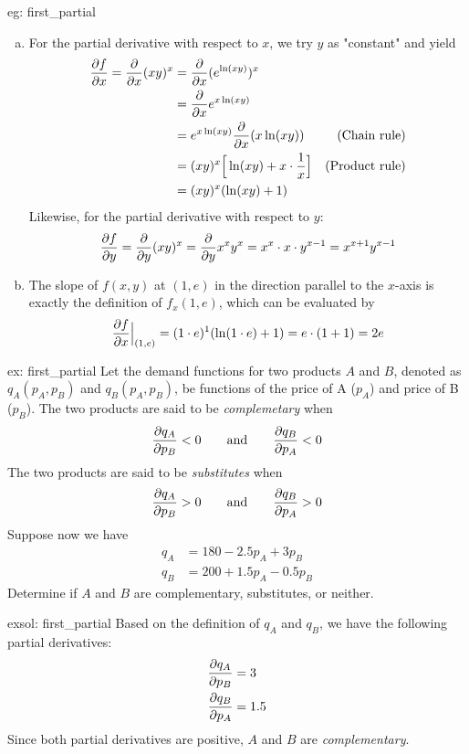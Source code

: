 \begin{egsol}[]{eg: first_partial}
    \begin{enumerate}[a)]
        \item For the partial derivative with respect to $x$, we try $y$ as "constant" and yield
        \begin{align*}
            \frac{\partial f}{\partial x} = \frac{\partial}{\partial x} (xy)^x&= \frac{\partial}{\partial x} (e^{\ln(xy)})^x &\\
            &= \frac{\partial}{\partial x} e^{x \ln(xy)}&\\
            &= e^{x \ln(xy)} \frac{\partial}{\partial x} (x \ln (xy))&\text{(Chain rule)}\\
            &= (xy)^x \Big[\ln(xy) + x \cdot \frac{1}{x}\Big]&\text{(Product rule)}\\
            &= (xy)^x(\ln(xy)+1)& 
        \end{align*}
        Likewise, for the partial derivative with respect to $y$:
        \[\frac{\partial f}{\partial y} = \frac{\partial}{\partial y}(xy)^x = \frac{\partial}{\partial y} x^x y^x = x^x \cdot x \cdot y^{x-1} = x^{x+1}y^{x-1}\]
        \item The slope of $f(x,y)$ at $(1,e)$ in the direction parallel to the $x$-axis is exactly the definition of $f_x(1,e)$, which can be evaluated by
        \[\frac{\partial f}{\partial x}\Big|_{(1,e)} = (1 \cdot e)^1 (\ln(1 \cdot e) + 1) = e \cdot (1+1) = 2e\]
    \end{enumerate}
\end{egsol}

\begin{ex}[]{ex: first_partial}
    Let the demand functions for two products $A$ and $B$, denoted as $q_A(p_A, p_B)$ and $q_B(p_A, p_B)$, be functions of the price of A ($p_A$) and price of B ($p_B$).  The two products are said to be \textit{complemetary} when 
    \[\frac{\partial q_A}{\partial p_B} < 0 \qquad \text{and} \qquad \frac{\partial q_B}{\partial p_A} < 0\]
    The two products are said to be \textit{substitutes} when 
    \[\frac{\partial q_A}{\partial p_B} > 0 \qquad \text{and} \qquad \frac{\partial q_B}{\partial p_A} > 0\]
    Suppose now we have 
    \begin{align*}
        q_A &= 180 - 2.5 p_A + 3 p_B\\
        q_B &= 200 + 1.5 p_A - 0.5 p_B 
    \end{align*}
    Determine if $A$ and $B$ are complementary, substitutes, or neither.
\end{ex}

\begin{exsol}[]{exsol: first_partial}
    Based on the definition of $q_A$ and $q_B$, we have the following partial derivatives:
    \begin{align*}
        \frac{\partial q_A}{\partial p_B} &= 3\\
        \frac{\partial q_B}{\partial p_A} &= 1.5
    \end{align*}
    Since both partial derivatives are positive, $A$ and $B$ are \textit{complementary}. 
\end{exsol}

